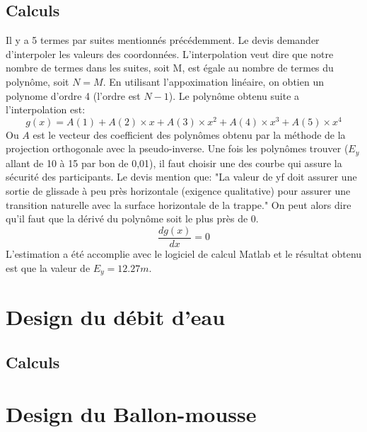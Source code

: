 \documentclass[12pt]{article}
\begin{document}
\subsection{Calculs}
Il y a 5 termes par suites mentionnés précédemment. Le devis demander d'interpoler les valeurs des coordonnées. L'interpolation veut dire que notre nombre de termes dans les suites, soit M, est égale au nombre de termes du polynôme, soit $N=M$. En utilisant l'appoximation linéaire, on obtien un polynome d'ordre 4 (l'ordre est $N-1$). Le polynôme obtenu suite a l'interpolation est: 
\begin{equation}
g(x) = A(1) + A(2)\times x + A(3)\times x^2 + A(4)\times x^3 + A(5)\times x^4 
\end{equation}
Ou $A$ est le vecteur des coefficient des polynômes obtenu par la méthode de la projection orthogonale avec la pseudo-inverse. 
\newpage
\noindent
Une fois les polynômes trouver ($E_y$ allant de 10 à 15 par bon de 0,01), il faut choisir une des courbe qui assure la sécurité des participants. Le devis mention que: "La valeur de yf doit assurer une sortie de glissade à peu près horizontale (exigence qualitative) pour assurer une transition naturelle avec la surface horizontale de la trappe." On peut alors dire qu'il faut que la dérivé du polynôme soit le plus près de 0. 
\begin{equation}
\frac{dg(x)}{dx} = 0
\end{equation}
L'estimation a été accomplie avec le logiciel de calcul Matlab et le résultat obtenu est que la valeur de $E_y = 12.27m$. 

\section{Design du débit d'eau}
\subsection{Calculs}

\section{Design du Ballon-mousse}
\end{document}
